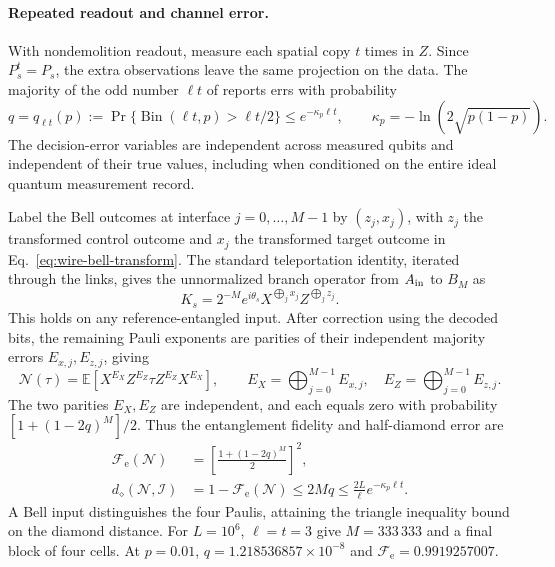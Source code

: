 \documentclass[aps,prl,twocolumn,superscriptaddress,longbibliography,reprint,floatfix]{revtex4-2}
\newcommand{\id}{\mathcal I}
\newcommand{\Fe}{\mathcal F_{\mathrm e}}
\begin{document}
\paragraph*{Repeated readout and channel error.}
With nondemolition readout, measure each spatial copy $t$ times in $Z$.
Since $P_s^t=P_s$, the extra observations leave the same projection on
the data. The majority of the odd number $\ell t$ of reports errs with
probability
\begin{equation}
 q=q_{\ell t}(p):=
 \Pr\{\operatorname{Bin}(\ell t,p)>\ell t/2\}
 \leq e^{-\kappa_p\ell t},
 \qquad \kappa_p=-\ln(2\sqrt{p(1-p)}).
 \label{eq:wire-majority}
\end{equation}
The decision-error variables are independent across measured qubits and
independent of their true values, including when conditioned on the
entire ideal quantum measurement record.

Label the Bell outcomes at interface $j=0,\ldots,M-1$ by
$(z_j,x_j)$, with $z_j$ the transformed control outcome and $x_j$
the transformed target outcome in Eq.~\eqref{eq:wire-bell-transform}.
The standard teleportation identity, iterated through the links,
gives the unnormalized branch operator from $A_{\rm in}$ to $B_M$ as
\begin{equation}
 K_s=2^{-M}e^{i\theta_s}
 X^{\bigoplus_jx_j}Z^{\bigoplus_jz_j}.
 \label{eq:wire-kraus}
\end{equation}
This holds on any reference-entangled input. After correction using the
decoded bits, the remaining Pauli exponents are parities of their
independent majority errors $E_{x,j},E_{z,j}$, giving
\begin{equation}
 \mathcal N(\tau)=
 \mathbb E\!\left[X^{E_X}Z^{E_Z}\tau Z^{E_Z}X^{E_X}\right],
 \qquad
 E_X=\bigoplus_{j=0}^{M-1}E_{x,j},\quad
 E_Z=\bigoplus_{j=0}^{M-1}E_{z,j}.
 \label{eq:wire-pauli-channel}
\end{equation}
The two parities $E_X,E_Z$ are independent, and each equals zero with
probability $[1+(1-2q)^M]/2$. Thus the entanglement fidelity and half-diamond
error are
\begin{align}
 \Fe(\mathcal N)&=
 \left[\frac{1+(1-2q)^M}{2}\right]^2,
 \label{eq:wire-fidelity}\\
 d_\diamond(\mathcal N,\id)
 &=1-\Fe(\mathcal N)\leq2Mq
 \leq\frac{2L}{\ell}e^{-\kappa_p\ell t}.
 \label{eq:wire-exact-error}
\end{align}
A Bell input distinguishes the four Paulis, attaining the triangle
inequality bound on the diamond distance. For $L=10^6$, $\ell=t=3$
give $M=333\,333$ and a final block of four cells. At $p=0.01$,
$q=1.218536857\times10^{-8}$ and $\Fe=0.9919257007$.
\end{document}
